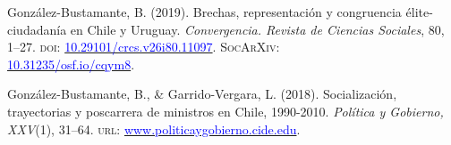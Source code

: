 \begin{publications}
\begin{benumerate}{9}
\item{\small González-Bustamante, B. (2019). Brechas, representación y congruencia élite-ciudadanía en Chile y Uruguay. {\itshape Convergencia. Revista de Ciencias Sociales}, 80, 1--27. {\scshape doi}: \href{https://doi.org/10.29101/crcs.v26i80.11097}{\textcolor{blue}{10.29101/crcs.v26i80.11097}}. {\scshape \footnotesize SocArXiv:} \\ \href{https://doi.org/10.31235/osf.io/cqym8}{\textcolor{blue}{10.31235/osf.io/cqym8}}.}\vspace{1mm} %


\item{\small González-Bustamante, B., \& Garrido-Vergara, L. (2018). Socialización, trayectorias y poscarrera de ministros en Chile, 1990-2010. {\itshape Política y Gobierno, XXV}(1), 31--64. {\scshape url:} \href{http://www.politicaygobierno.cide.edu/index.php/pyg/article/view/1080}{\textcolor{blue}{www.politicaygobierno.cide.edu}}.}\vspace{1mm}

\end{benumerate}

\end{publications}


